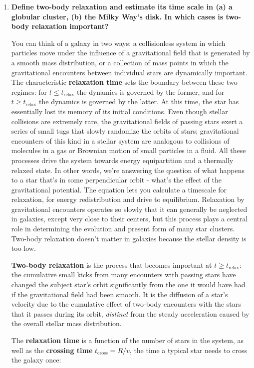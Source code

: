 \documentclass[12pt, letterpaper, preprint]{aastex}
\newcommand{\trelax}{\mbox{$t_\mathrm{relax}$}}
\newcommand{\tcross}{\mbox{$t_\mathrm{cross}$}}
\begin{document}
\begin{enumerate}

\item \textbf{Define two-body relaxation and estimate its time scale in (a) a globular cluster, (b) the Milky Way's disk. In which cases is two-body relaxation important?}

You can think of a galaxy in two ways:
a collisionless system in which particles move under the influence of a gravitational field that is generated by a smooth mass distribution,
or a collection of mass points in which the gravitational encounters between individual stars are dynamically important.
The characteristic \textbf{relaxation time} sets the boundary between these two regimes: for $t \leq \trelax$ the dynamics is governed by the former,
and for $t \geq \trelax$ the dynamics is governed by the latter. At this time, the star has essentially lost its memory of its initial conditions. Even though stellar collisions are extremely rare, the gravitational fields of passing stars exert a series of small tugs that slowly randomize the orbits of stars; gravitational encounters of this kind in a stellar system are analogous to collisions of molecules in a gas or Brownian motion of small particles in a fluid. All these processes drive the system towards energy equipartition and a thermally relaxed state.
In other words, we're answering the question of what happens to a star that's in some perpendicular orbit - what's the effect of the gravitational potential. The equation lets you calculate a timescale for relaxation, for energy redistribution and drive to equilibrium. 
Relaxation by gravitational encounters operates so slowly that it can generally be neglected in galaxies, except very close to their centers, but this process plays a central role in determining the evolution and present form of many star clusters. Two-body relaxation doesn't matter in galaxies because the stellar density is too low. 

\textbf{Two-body relaxation} is the process that becomes important at $t \geq \trelax$: the cumulative small kicks from many encounters with passing stars have changed the subject star's orbit significantly from the one it would have had if the gravitational field had been smooth. 
It is the diffusion of a star's velocity due to the cumulative effect of two-body encounters with the stars that it passes during its orbit, \emph{distinct} from the steady acceleration caused by the overall stellar mass distribution.

The \textbf{relaxation time} is a function of the number of stars in the system, as well as the \textbf{crossing time} $\tcross = R/v$, the time a typical star needs to cross the galaxy once:


\end{enumerate}
\end{document}
